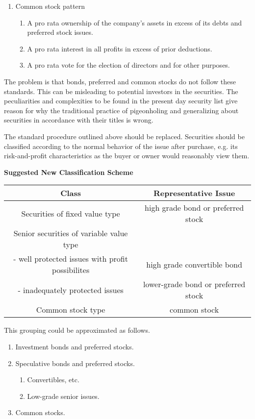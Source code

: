\documentclass{article}
\begin{document}
\begin{itemize}
\begin{enumerate}
\begin{enumerate}
\end{enumerate}
\item Common stock pattern
\begin{enumerate}
\item A pro rata ownership of the company's assets in excess of its debts and preferred stock issues.
\item A pro rata interest in all profits in excess of prior deductions.
\item A pro rata vote for the election of directors and for other purposes.
\end{enumerate}
\end{enumerate}
The problem is that bonds, preferred and common stocks do not follow these standards. This can be misleading to potential investors in the securities. The peculiarities and complexities to be found in the present day security list give reason for why the traditional practice of pigeonholing and generalizing about securities in accordance with their titles is wrong.
\end{itemize}
The standard procedure outlined above should be replaced. Securities should be classified according to the normal behavior of the issue after purchase, e.g. its risk-and-profit characteristics as the buyer or owner would reasonably view them.
\par 
\textbf{Suggested New Classification Scheme}
\begin{center}
  \begin{tabular}{ c | c }
    \textbf{Class} & \textbf{Representative Issue} \\ 
    \hline
    Securities of fixed value type & high grade bond or preferred stock \\ 
    \hline
    Senior securities of variable value type & \\ 
    - well protected issues with profit possibilites & high grade convertible bond \\ 
    - inadequately protected issues & lower-grade bond or preferred stock \\ 
    \hline
    Common stock type & common stock \\
  \end{tabular}
\end{center}
This grouping could be approximated as follows.
\begin{enumerate}
\item Investment bonds and preferred stocks. 
\item Speculative bonds and preferred stocks.
\begin{enumerate}
\item Convertibles, etc.
\item Low-grade senior issues.
\end{enumerate}
\item Common stocks.
\end{enumerate}
\end{document}

